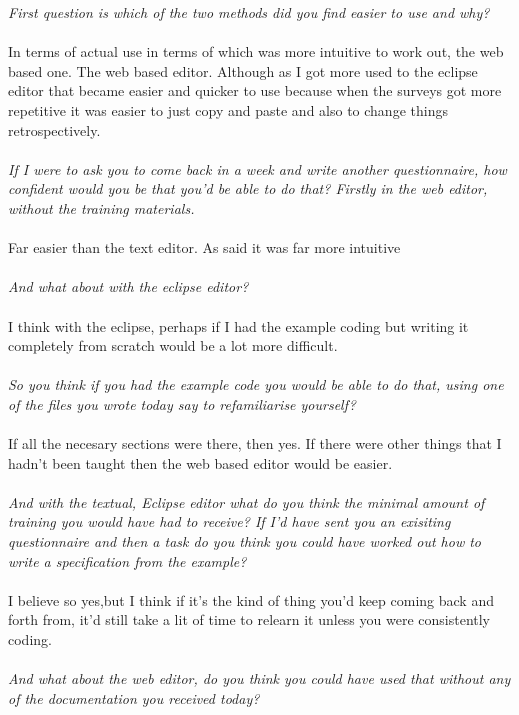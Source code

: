 \documentclass{report}
\begin{document}
\textit{First question is which of the two methods did you find easier to use and why?}
\\
\\
In terms of actual use in terms of which was more intuitive to work out, the web based one. The web based editor. Although as I got more used to the eclipse editor that became easier and quicker to use because when the surveys got more repetitive it was easier to just copy and paste and also to change things retrospectively.
\\
\\
\textit{If I were to ask you to come back in a week and write another questionnaire, how confident would you be that you'd be able to do that? Firstly in the web editor, without the training materials.}
\\
\\
Far easier than the text editor. As said it was far more intuitive
\\
\\
\textit{And what about with the eclipse editor?}
\\
\\
I think with the eclipse, perhaps if I had the example coding but writing it completely from scratch would be a lot more difficult.
\\
\\
\textit{So you think if you had the example code you would be able to do that, using one of the files you wrote today say to refamiliarise yourself?}
\\
\\
If all the necesary sections were there, then yes. If there were other things that I hadn't been taught then the web based editor would be easier.
\\
\\
\textit{And with the textual, Eclipse editor what do you think the minimal amount of training you would have had to receive? If I'd have sent you an exisiting questionnaire and then a task do you think you could have worked out how to write a specification from the example?}
\\
\\
I believe so yes,but I think if it's the kind of thing you'd keep coming back and forth from, it'd still take a lit of time to relearn it unless you were consistently coding.
\\
\\
\textit{And what about the web editor, do you think you could have used that without any of the documentation you received today?}
\end{document}
